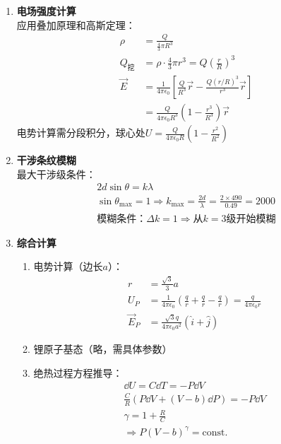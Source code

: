 \documentclass[12pt]{article}
\begin{document}
\begin{enumerate}
    \item \textbf{电场强度计算} \\
    应用叠加原理和高斯定理：
    \begin{align*}
        \rho &= \frac{Q}{\frac{4}{3}\pi R^3} \\
        Q_{\text{挖}} &= \rho \cdot \frac{4}{3}\pi r^3 = Q\left(\frac{r}{R}\right)^3 \\
        \vec{E} &= \frac{1}{4\pi\epsilon_0}\left[ \frac{Q}{R^3}\vec{r} - \frac{Q(r/R)^3}{r^3}\vec{r} \right] \\
        &= \frac{Q}{4\pi\epsilon_0 R^3}\left(1 - \frac{r^3}{R^3}\right)\vec{r}
    \end{align*}
    电势计算需分段积分，球心处$U=\frac{Q}{4\pi\epsilon_0 R}\left(1-\frac{r^2}{R^2}\right)$
    
    \item \textbf{干涉条纹模糊} \\
    最大干涉级条件：
    \begin{gather*}
        2d \sin\theta = k\lambda \\
        \sin\theta_{\text{max}} = 1 \Rightarrow k_{\text{max}} = \frac{2d}{\lambda} = \frac{2\times490}{0.49} = 2000 \\
        \text{模糊条件：} \Delta k = 1 \Rightarrow \text{从}k=3\text{级开始模糊}
    \end{gather*}
    
    \item \textbf{综合计算}
    \begin{enumerate}
        \item 电势计算（边长$a$）：
        \begin{align*}
            r &= \frac{\sqrt{3}}{3}a \\
            U_P &= \frac{1}{4\pi\epsilon_0}\left(\frac{q}{r} + \frac{q}{r} - \frac{q}{r}\right) = \frac{q}{4\pi\epsilon_0 r} \\
            \vec{E}_P &= \frac{\sqrt{3}q}{4\pi\epsilon_0 a^2}(\hat{i} + \hat{j})
        \end{align*}
        
        \item 锂原子基态（略，需具体参数）
        
        \item 绝热过程方程推导：
        \begin{gather*}
            \dd{U} = C \dd{T} = -P \dd{V} \\
            \frac{C}{R}(P \dd{V} + (V-b)\dd{P}) = -P \dd{V} \\
            \gamma = 1 + \frac{R}{C} \\
            \Rightarrow P(V-b)^\gamma = \text{const.}
        \end{gather*}
    \end{enumerate}
\end{enumerate}
\end{document}
